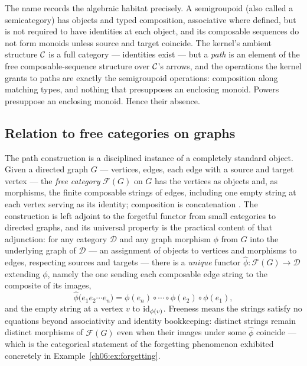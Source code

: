 \begin{remark}
\label{ch06:rem:semigroupoid}
The name records the algebraic habitat precisely. A semigroupoid (also
called a semicategory) has objects and typed composition, associative
where defined, but is not required to have identities at each object, and
its composable sequences do not form monoids unless source and target
coincide. The kernel's ambient structure $\mathcal{C}$ is a full category ---
identities exist --- but a \emph{path} is an element of the free
composable-sequence structure over $\mathcal{C}$'s arrows, and the operations the
kernel grants to paths are exactly the semigroupoid operations: composition
along matching types, and nothing that presupposes an enclosing monoid.
Powers presuppose an enclosing monoid. Hence their absence.
\end{remark}

\subsection{Relation to free categories on graphs}
\label{ch06:sec:free}

The path construction is a disciplined instance of a completely standard
object. Given a directed graph $G$ --- vertices, edges, each edge with a
source and target vertex --- the \emph{free category} $\mathcal{F}(G)$ on
$G$ has the vertices as objects and, as morphisms, the finite composable
strings of edges, including one empty string at each vertex serving as its
identity; composition is concatenation \cite{maclanecwm}. The
construction is left adjoint to the forgetful functor from small
categories to directed graphs, and its universal property is the
practical content of that adjunction: for any category $\mathcal{D}$ and
any graph morphism $\phi$ from $G$ into the underlying graph of
$\mathcal{D}$ --- an assignment of objects to vertices and morphisms to
edges, respecting sources and targets --- there is a \emph{unique}
functor $\hat{\phi} : \mathcal{F}(G) \to \mathcal{D}$ extending $\phi$,
namely the one sending each composable edge string to the composite of
its images,
\[
  \hat{\phi}\bigl(e_1 e_2 \cdots e_n\bigr)
  = \phi(e_n) \circ \cdots \circ \phi(e_2) \circ \phi(e_1),
\]
and the empty string at a vertex $v$ to $\mathrm{id}_{\phi(v)}$. Freeness means
the strings satisfy no equations beyond associativity and identity
bookkeeping: distinct strings remain distinct morphisms of
$\mathcal{F}(G)$ even when their images under some $\hat{\phi}$
coincide --- which is the categorical statement of the forgetting
phenomenon exhibited concretely in Example~\ref{ch06:ex:forgetting}.

